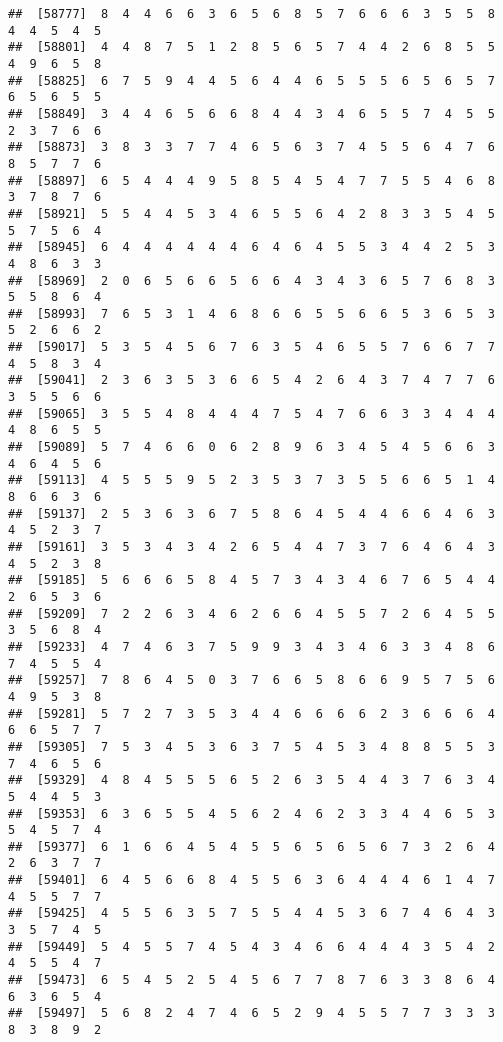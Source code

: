 \documentclass[
]{book}
\begin{document}
\begin{verbatim}
##  [58777]  8  4  4  6  6  3  6  5  6  8  5  7  6  6  6  3  5  5  8  4  4  5  4  5
##  [58801]  4  4  8  7  5  1  2  8  5  6  5  7  4  4  2  6  8  5  5  4  9  6  5  8
##  [58825]  6  7  5  9  4  4  5  6  4  4  6  5  5  5  6  5  6  5  7  6  5  6  5  5
##  [58849]  3  4  4  6  5  6  6  8  4  4  3  4  6  5  5  7  4  5  5  2  3  7  6  6
##  [58873]  3  8  3  3  7  7  4  6  5  6  3  7  4  5  5  6  4  7  6  8  5  7  7  6
##  [58897]  6  5  4  4  4  9  5  8  5  4  5  4  7  7  5  5  4  6  8  3  7  8  7  6
##  [58921]  5  5  4  4  5  3  4  6  5  5  6  4  2  8  3  3  5  4  5  5  7  5  6  4
##  [58945]  6  4  4  4  4  4  4  6  4  6  4  5  5  3  4  4  2  5  3  4  8  6  3  3
##  [58969]  2  0  6  5  6  6  5  6  6  4  3  4  3  6  5  7  6  8  3  5  5  8  6  4
##  [58993]  7  6  5  3  1  4  6  8  6  6  5  5  6  6  5  3  6  5  3  5  2  6  6  2
##  [59017]  5  3  5  4  5  6  7  6  3  5  4  6  5  5  7  6  6  7  7  4  5  8  3  4
##  [59041]  2  3  6  3  5  3  6  6  5  4  2  6  4  3  7  4  7  7  6  3  5  5  6  6
##  [59065]  3  5  5  4  8  4  4  4  7  5  4  7  6  6  3  3  4  4  4  4  8  6  5  5
##  [59089]  5  7  4  6  6  0  6  2  8  9  6  3  4  5  4  5  6  6  3  4  6  4  5  6
##  [59113]  4  5  5  5  9  5  2  3  5  3  7  3  5  5  6  6  5  1  4  8  6  6  3  6
##  [59137]  2  5  3  6  3  6  7  5  8  6  4  5  4  4  6  6  4  6  3  4  5  2  3  7
##  [59161]  3  5  3  4  3  4  2  6  5  4  4  7  3  7  6  4  6  4  3  4  5  2  3  8
##  [59185]  5  6  6  6  5  8  4  5  7  3  4  3  4  6  7  6  5  4  4  2  6  5  3  6
##  [59209]  7  2  2  6  3  4  6  2  6  6  4  5  5  7  2  6  4  5  5  3  5  6  8  4
##  [59233]  4  7  4  6  3  7  5  9  9  3  4  3  4  6  3  3  4  8  6  7  4  5  5  4
##  [59257]  7  8  6  4  5  0  3  7  6  6  5  8  6  6  9  5  7  5  6  4  9  5  3  8
##  [59281]  5  7  2  7  3  5  3  4  4  6  6  6  6  2  3  6  6  6  4  6  6  5  7  7
##  [59305]  7  5  3  4  5  3  6  3  7  5  4  5  3  4  8  8  5  5  3  7  4  6  5  6
##  [59329]  4  8  4  5  5  5  6  5  2  6  3  5  4  4  3  7  6  3  4  5  4  4  5  3
##  [59353]  6  3  6  5  5  4  5  6  2  4  6  2  3  3  4  4  6  5  3  5  4  5  7  4
##  [59377]  6  1  6  6  4  5  4  5  5  6  5  6  5  6  7  3  2  6  4  2  6  3  7  7
##  [59401]  6  4  5  6  6  8  4  5  5  6  3  6  4  4  4  6  1  4  7  4  5  5  7  7
##  [59425]  4  5  5  6  3  5  7  5  5  4  4  5  3  6  7  4  6  4  3  3  5  7  4  5
##  [59449]  5  4  5  5  7  4  5  4  3  4  6  6  4  4  4  3  5  4  2  4  5  5  4  7
##  [59473]  6  5  4  5  2  5  4  5  6  7  7  8  7  6  3  3  8  6  4  6  3  6  5  4
##  [59497]  5  6  8  2  4  7  4  6  5  2  9  4  5  5  7  7  3  3  3  8  3  8  9  2

\end{verbatim}
\end{document}
